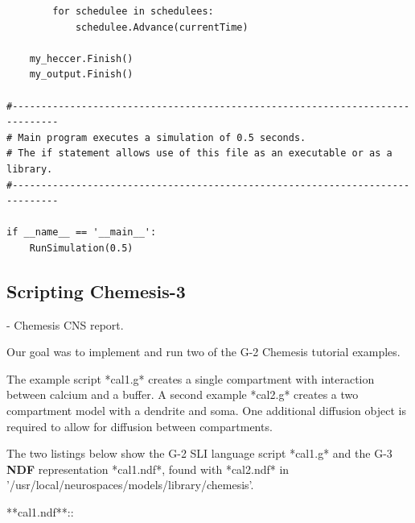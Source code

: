 \documentclass[12pt]{article}
\begin{document}
\begin{verbatim}
        for schedulee in schedulees:
            schedulee.Advance(currentTime)

    my_heccer.Finish()
    my_output.Finish()
  
#------------------------------------------------------------------------------
# Main program executes a simulation of 0.5 seconds.
# The if statement allows use of this file as an executable or as a library.
#------------------------------------------------------------------------------

if __name__ == '__main__':
    RunSimulation(0.5)
\end{verbatim}



\subsection{Scripting Chemesis-3}

- Chemesis CNS report.

Our goal was to implement and run two of the G-2 Chemesis tutorial examples.

The example script *cal1.g* creates a single compartment with interaction
between calcium and a buffer.  A second example *cal2.g* creates a two
compartment model with a dendrite and soma. One additional diffusion object
is required to allow for diffusion between compartments.

The two listings below show the G-2 SLI language script *cal1.g* and the G-3
{\bf NDF} representation *cal1.ndf*, found with *cal2.ndf* in
'/usr/local/neurospaces/models/library/chemesis'.


**cal1.ndf**::
\end{document}
